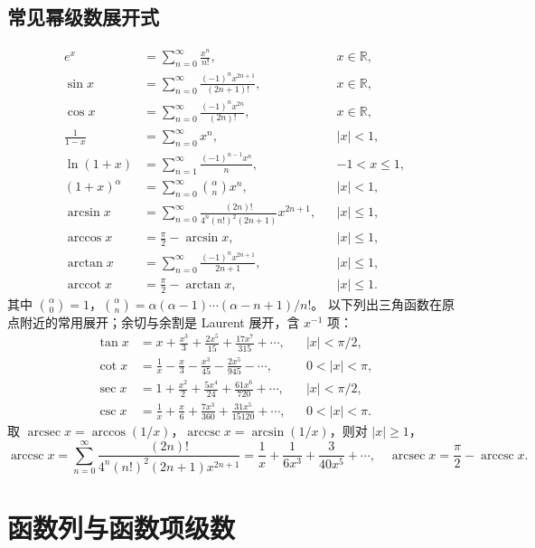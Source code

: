 \documentclass[../main.tex]{subfiles}
\begin{document}
\subsection{常见幂级数展开式}
\begin{align*}
e^x&=\sum_{n=0}^\infty\frac{x^n}{n!}, &&x\in\mathbb R,\\
\sin x&=\sum_{n=0}^\infty\frac{(-1)^nx^{2n+1}}{(2n+1)!}, &&x\in\mathbb R,\\
\cos x&=\sum_{n=0}^\infty\frac{(-1)^nx^{2n}}{(2n)!}, &&x\in\mathbb R,\\
\frac1{1-x}&=\sum_{n=0}^\infty x^n, &&|x|<1,\\
\ln(1+x)&=\sum_{n=1}^\infty\frac{(-1)^{n-1}x^n}{n}, &&-1<x\le1,\\
(1+x)^\alpha&=\sum_{n=0}^\infty\binom\alpha n x^n, &&|x|<1,\\
\arcsin x&=\sum_{n=0}^\infty\frac{(2n)!}{4^n(n!)^2(2n+1)}x^{2n+1}, &&|x|\le1,\\
\arccos x&=\frac\pi2-\arcsin x, &&|x|\le1,\\
\arctan x&=\sum_{n=0}^\infty\frac{(-1)^nx^{2n+1}}{2n+1}, &&|x|\le1,\\
\operatorname{arccot}x&=\frac\pi2-\arctan x, &&|x|\le1.
\end{align*}
其中 $\binom\alpha0=1$，$\binom\alpha n=\alpha(\alpha-1)\cdots(\alpha-n+1)/n!$。
以下列出三角函数在原点附近的常用展开；余切与余割是 Laurent 展开，含 $x^{-1}$ 项：
\begin{align*}
\tan x&=x+\frac{x^3}3+\frac{2x^5}{15}+\frac{17x^7}{315}+\cdots,
&&|x|<\pi/2,\\
\cot x&=\frac1x-\frac x3-\frac{x^3}{45}-\frac{2x^5}{945}-\cdots,
&&0<|x|<\pi,\\
\sec x&=1+\frac{x^2}2+\frac{5x^4}{24}+\frac{61x^6}{720}+\cdots,
&&|x|<\pi/2,\\
\csc x&=\frac1x+\frac x6+\frac{7x^3}{360}+\frac{31x^5}{15120}+\cdots,
&&0<|x|<\pi.
\end{align*}
取 $\operatorname{arcsec}x=\arccos(1/x)$，$\operatorname{arccsc}x=\arcsin(1/x)$，则对 $|x|\ge1$，
\[
\operatorname{arccsc}x=\sum_{n=0}^\infty
\frac{(2n)!}{4^n(n!)^2(2n+1)x^{2n+1}}
=\frac1x+\frac1{6x^3}+\frac3{40x^5}+\cdots,\quad
\operatorname{arcsec}x=\frac\pi2-\operatorname{arccsc}x.
\]
\section{函数列与函数项级数}
\end{document}
